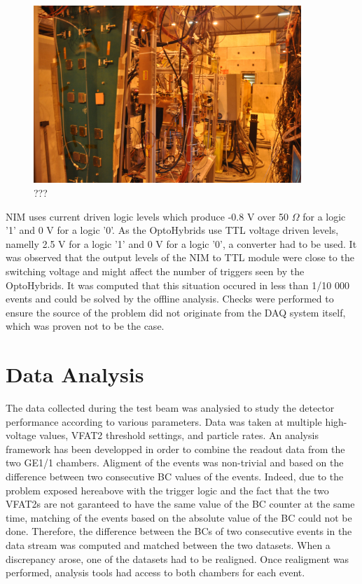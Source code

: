       \begin{figure}
        \centering
        \includegraphics[width=0.9\textwidth]{img/II-3-test-beam/test-setup.jpg}
        \caption{???}
        \label{fig:II-3-test-setup}
      \end{figure}

      NIM uses current driven logic levels which produce -0.8 V over 50 $\Omega$ for a logic '1' and 0 V for a logic '0'. As the OptoHybrids use TTL voltage driven levels, namelly 2.5 V for a logic '1' and 0 V for a logic '0', a converter had to be used. It was observed that the output levels of the NIM to TTL module were close to the switching voltage and might affect the number of triggers seen by the OptoHybrids. It was computed that this situation occured in less than 1/10 000 events and could be solved by the offline analysis. Checks were performed to ensure the source of the problem did not originate from the DAQ system itself, which was proven not to be the case.

  \section{Data Analysis}

    The data collected during the test beam was analysied to study the detector performance according to various parameters. Data was taken at multiple high-voltage values, VFAT2 threshold settings, and particle rates. An analysis framework has been developped in order to combine the readout data from the two GE1/1 chambers. Aligment of the events was non-trivial and based on the difference between two consecutive BC values of the events. Indeed, due to the problem exposed hereabove with the trigger logic and the fact that the two VFAT2s are not garanteed to have the same value of the BC counter at the same time, matching of the events based on the absolute value of the BC could not be done. Therefore, the difference between the BCs of two consecutive events in the data stream was computed and matched between the two datasets. When a discrepancy arose, one of the datasets had to be realigned. Once realigment was performed, analysis tools had access to both chambers for each event.

